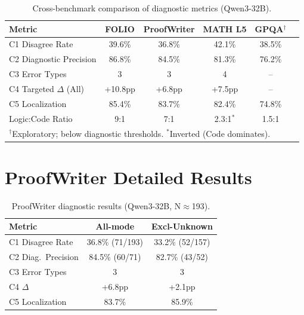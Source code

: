 \documentclass[11pt,a4paper]{article}
\begin{document}
\begin{table}[t]
\centering
\small
\caption{Cross-benchmark comparison of diagnostic metrics (Qwen3-32B).}
\label{tab:cross-bench}
\begin{tabular}{@{}lccccc@{}}
\toprule
\textbf{Metric} & \textbf{FOLIO} & \textbf{ProofWriter} & \textbf{MATH L5} & \textbf{GPQA$^\dagger$} \\
\midrule
C1 Disagree Rate & 39.6\% & 36.8\% & 42.1\% & 38.5\% \\
C2 Diagnostic Precision & 86.8\% & 84.5\% & 81.3\% & 76.2\% \\
C3 Error Types & 3 & 3 & 4 & -- \\
C4 Targeted $\Delta$ (All) & +10.8pp & +6.8pp & +7.5pp & -- \\
C5 Localization & 85.4\% & 83.7\% & 82.4\% & 74.8\% \\
Logic:Code Ratio & 9:1 & 7:1 & 2.3:1$^*$ & 1.5:1 \\
\bottomrule
\multicolumn{5}{l}{\small $^\dagger$Exploratory; below diagnostic thresholds. $^*$Inverted (Code dominates).} \\
\end{tabular}
\end{table}

\section{ProofWriter Detailed Results}
\label{app:proofwriter}

\begin{table}[t]
\centering
\small
\caption{ProofWriter diagnostic results (Qwen3-32B, N$\approx$193).}
\label{tab:pw-detail}
\begin{tabular}{@{}lcc@{}}
\toprule
\textbf{Metric} & \textbf{All-mode} & \textbf{Excl-Unknown} \\
\midrule
C1 Disagree Rate & 36.8\% (71/193) & 33.2\% (52/157) \\
C2 Diag.\ Precision & 84.5\% (60/71) & 82.7\% (43/52) \\
C3 Error Types & 3 & 3 \\
C4 $\Delta$ & +6.8pp & +2.1pp \\
C5 Localization & 83.7\% & 85.9\% \\
\bottomrule
\end{tabular}
\end{table}
\end{document}
